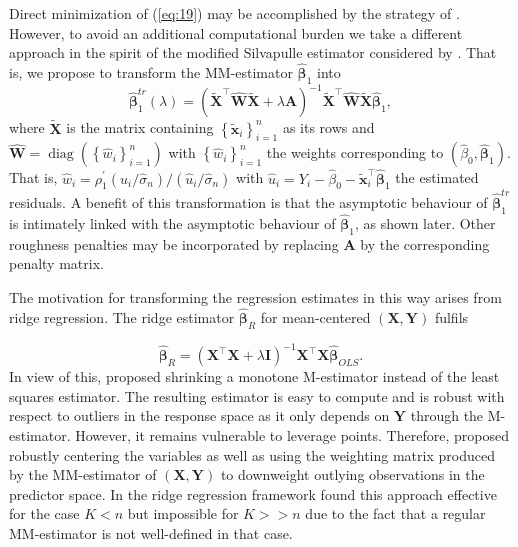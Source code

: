 \documentclass[11pt]{article}
\DeclareMathOperator{\diag}{diag}
\begin{document}
Direct minimization of (\ref{eq:19}) may be accomplished by the strategy of \cite{maronna2013robust}. However, to avoid an additional computational burden we take a different approach in the spirit of the modified Silvapulle estimator considered by \citep{maronna2011robust}. That is,  we propose to transform the MM-estimator $\widehat{\boldsymbol{\beta}}_{1}$ into
\begin{equation}
\label{eq:20}
\widehat{\boldsymbol{\beta}}^{tr}_{1} \left(\lambda \right) = \left(\widetilde{\mathbf{X}}^{\top} \widehat{\mathbf{W}} \widetilde{\mathbf{X}} + \lambda \mathbf{A} \right)^{-1} \widetilde{\mathbf{X}}^{\top} \widehat{\mathbf{W}} \widetilde{\mathbf{X}} \widehat{\boldsymbol{\beta}}_{1},
\end{equation}
where $\mathbf{\widetilde{X}}$ is the matrix containing $\left\{\widetilde{\mathbf{x}}_i \right\}_{i=1}^n$ as its rows and $\widehat{\mathbf{W}} = \diag \left( \left\{ \widehat{w}_i  \right\}_{i=1}^n \right)$ with $\left\{ \widehat{w}_i  \right\}_{i=1}^n$ the weights corresponding to $(\widehat{\beta}_0, \widehat{\boldsymbol{\beta}}_{1})$. That is, $\widehat{w}_i = \rho_1^{\prime} \left( \widehat{u}_i/\widehat{\sigma}_n \right)/\left( \widehat{u}_i/\widehat{\sigma}_n \right) $ with $ \widehat{u}_i = Y_i - \widehat{\beta}_0 - \widetilde{\mathbf{x}}_i^{\top} \widehat{\boldsymbol{\beta}}_1$ the estimated residuals.  A benefit of this transformation is that the asymptotic behaviour of $\widehat{\boldsymbol{\beta}}_1^{tr} $ is intimately linked with the asymptotic behaviour of $\widehat{\boldsymbol{\beta}}_{1}$, as shown later. Other roughness penalties may be incorporated by replacing $\mathbf{A}$ by the corresponding penalty matrix.

The motivation for transforming the regression estimates in this way arises from ridge regression. The ridge estimator $\widehat{\boldsymbol{\beta}}_{R}$ for mean-centered $\left(\mathbf{X}, \mathbf{Y} \right)$ fulfils 

\begin{equation}
\label{eq:21}
\widehat{\boldsymbol{\beta}}_{R} = \left(\mathbf{X}^{\top} \mathbf{X} + \lambda \mathbf{I} \right)^{-1} \mathbf{X}^{\top} \mathbf{X} \widehat{\boldsymbol{\beta}}_{OLS}.
\end{equation}
In view of this, \cite{silvapulle1991robust} proposed shrinking a  monotone M-estimator instead of the least squares estimator. The resulting estimator is easy to compute and is robust with respect to outliers in the response space as it only depends on $\mathbf{Y}$ through the M-estimator. However, it remains vulnerable to leverage points. Therefore, \cite{maronna2011robust} proposed robustly centering the variables as well as using the weighting matrix produced by the MM-estimator of $\left(\mathbf{X}, \mathbf{Y}\right)$ to downweight outlying observations in the predictor space. In the ridge regression framework \cite{maronna2011robust} found this approach  effective for the case $K<n$ but impossible for $K>>n$ due to the fact that a regular MM-estimator is not well-defined in that case. 
\end{document}

